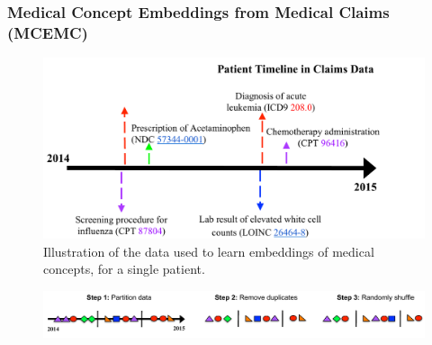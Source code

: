 \documentclass{beamer}
\begin{document}
\begin{frame}
\frametitle{Medical Concept Embeddings from
Medical Claims (MCEMC)}
\begin{figure}[t]
    \centering 
    \includegraphics[width=.6\linewidth]{figs/Figure1-claims-timeline.pdf}
    \caption{\scriptsize Illustration of the data used to learn
      embeddings of medical concepts, for a single patient.\label{fig:temporal}}
\end{figure}

\begin{figure}[t]
    \centering 
    \includegraphics[width=0.9\linewidth]{figs/algorithm1_figure.pdf}
    \caption{\footnotesize
}
\end{figure}

\end{frame}
\end{document}
